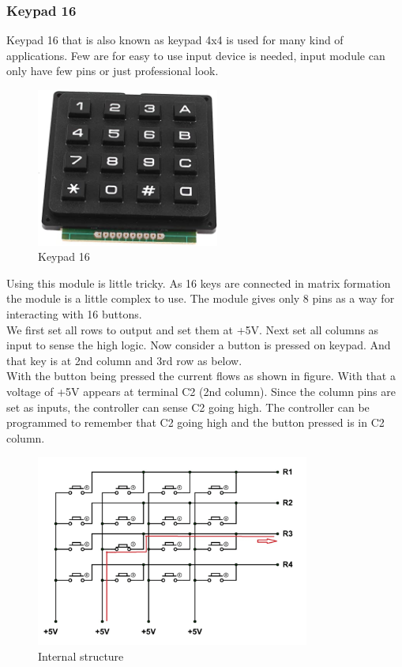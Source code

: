 \documentclass[a4paper]{article}
\begin{document}
\subsubsection{Keypad 16}
Keypad 16 that is also known as keypad 4x4 is used for many kind of applications. Few are for easy to use input device is needed, input module can only have few pins or just professional look.
\begin{figure}[h!]
\centering
\includegraphics[width=6cm]{images/keypad.jpg}
\caption*{Keypad 16}
\end{figure}
\newline
\noindent
Using this module is little tricky. As 16 keys are connected in matrix formation the module is a little complex to use. The module gives only 8 pins as a way for interacting with 16 buttons.\\
We first set all rows to output and set them at +5V. Next set all columns as input to sense the high logic. Now consider a button is pressed on keypad. And that key is at 2nd column and 3rd row as below.\\
With the button being pressed the current flows as shown in figure. With that a voltage of +5V appears at terminal C2 (2nd column). Since the column pins are set as inputs, the controller can sense C2 going high. The controller can be programmed to remember that C2 going high and the button pressed is in C2 column.
\begin{figure}[h!]
\centering
\includegraphics[width=9cm]{images/keypad_pins.png}
\caption*{Internal structure}
\end{figure}
\end{document}

